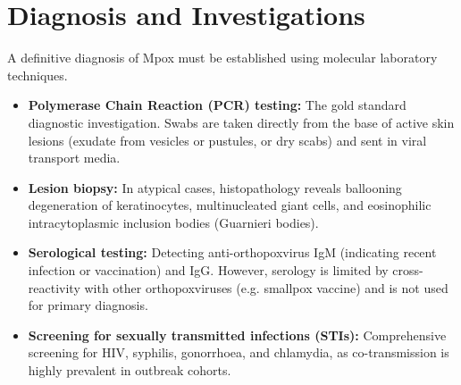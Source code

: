 \section*{Diagnosis and Investigations}
A definitive diagnosis of Mpox must be established using molecular laboratory techniques.
\begin{itemize}
    \item \textbf{Polymerase Chain Reaction (PCR) testing:} The gold standard diagnostic investigation. Swabs are taken directly from the base of active skin lesions (exudate from vesicles or pustules, or dry scabs) and sent in viral transport media.
    \item \textbf{Lesion biopsy:} In atypical cases, histopathology reveals ballooning degeneration of keratinocytes, multinucleated giant cells, and eosinophilic intracytoplasmic inclusion bodies (Guarnieri bodies).
    \item \textbf{Serological testing:} Detecting anti-orthopoxvirus IgM (indicating recent infection or vaccination) and IgG. However, serology is limited by cross-reactivity with other orthopoxviruses (e.g. smallpox vaccine) and is not used for primary diagnosis.
    \item \textbf{Screening for sexually transmitted infections (STIs):} Comprehensive screening for HIV, syphilis, gonorrhoea, and chlamydia, as co-transmission is highly prevalent in outbreak cohorts.
\end{itemize}

